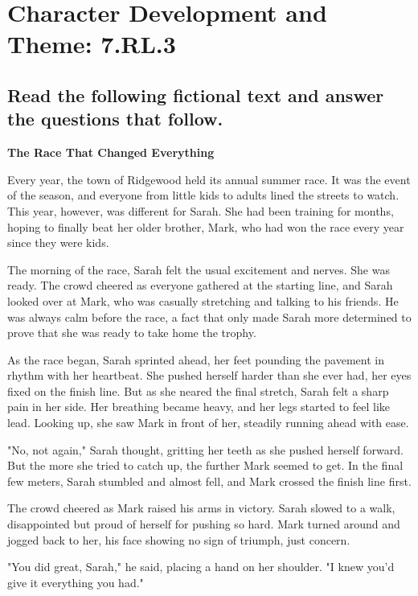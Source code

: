 \documentclass[12pt]{article}
\begin{document}
\onehalfspacing

\section*{Character Development and Theme: 7.RL.3}

\subsection*{Read the following fictional text and answer the questions that follow.}

\begin{flushleft}
\textbf{The Race That Changed Everything}
\end{flushleft}

Every year, the town of Ridgewood held its annual summer race. It was the event of the season, and everyone from little kids to adults lined the streets to watch. This year, however, was different for Sarah. She had been training for months, hoping to finally beat her older brother, Mark, who had won the race every year since they were kids.

The morning of the race, Sarah felt the usual excitement and nerves. She was ready. The crowd cheered as everyone gathered at the starting line, and Sarah looked over at Mark, who was casually stretching and talking to his friends. He was always calm before the race, a fact that only made Sarah more determined to prove that she was ready to take home the trophy.

As the race began, Sarah sprinted ahead, her feet pounding the pavement in rhythm with her heartbeat. She pushed herself harder than she ever had, her eyes fixed on the finish line. But as she neared the final stretch, Sarah felt a sharp pain in her side. Her breathing became heavy, and her legs started to feel like lead. Looking up, she saw Mark in front of her, steadily running ahead with ease.

"No, not again," Sarah thought, gritting her teeth as she pushed herself forward. But the more she tried to catch up, the further Mark seemed to get. In the final few meters, Sarah stumbled and almost fell, and Mark crossed the finish line first.

The crowd cheered as Mark raised his arms in victory. Sarah slowed to a walk, disappointed but proud of herself for pushing so hard. Mark turned around and jogged back to her, his face showing no sign of triumph, just concern.

"You did great, Sarah," he said, placing a hand on her shoulder. "I knew you'd give it everything you had."
\end{document}
